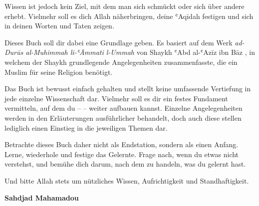 Wissen ist jedoch kein Ziel, mit dem man sich schmückt oder sich über andere erhebt. Vielmehr
soll es dich Allah  näherbringen, deine ʿAqīdah festigen und sich in deinen Worten und
Taten zeigen.

Dieses Buch soll dir dabei eine Grundlage geben. Es basiert auf dem Werk \emph{ad-Durūs
al-Muhimmah li-ʿĀmmati l-Ummah} von Shaykh ʿAbd al-ʿAzīz ibn Bāz , in welchem
der Shaykh grundlegende Angelegenheiten zusammenfasste, die ein Muslim für seine Religion
benötigt.

Das Buch ist bewusst einfach gehalten und stellt keine umfassende Vertiefung in jede einzelne
Wissenschaft dar. Vielmehr soll es dir ein festes Fundament vermitteln, auf dem du – 
– weiter aufbauen kannst. Einzelne Angelegenheiten werden in den Erläuterungen ausführlicher
behandelt, doch auch diese stellen lediglich einen Einstieg in die jeweiligen Themen dar.

Betrachte dieses Buch daher nicht als Endstation, sondern als einen Anfang. Lerne, wiederhole
und festige das Gelernte. Frage nach, wenn du etwas nicht verstehst, und bemühe dich darum,
nach dem zu handeln, was du gelernt hast.

Und bitte Allah  stets um nützliches Wissen, Aufrichtigkeit und Standhaftigkeit.

\vspace{1.5em}
\begin{flushright}
\textbf{Sahdjad Mahamadou}
\end{flushright}
\clearpage
